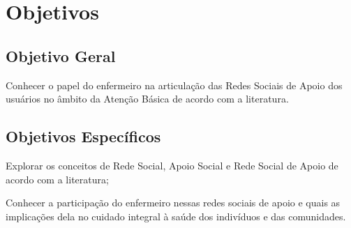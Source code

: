 \section{Objetivos}
\label{sec:objetivos}

\subsection{Objetivo Geral}
\label{sec:objetivo-geral}

Conhecer o papel do enfermeiro na articulação das Redes Sociais de Apoio dos usuários no âmbito da Atenção Básica de acordo com a literatura.

\subsection{Objetivos Específicos}
\label{sec:objetivos-especificos}

\begin{alineas}
	\item Explorar os conceitos de Rede Social, Apoio Social e Rede Social de Apoio de acordo com a literatura;
	\item Conhecer a participação do enfermeiro nessas redes sociais de apoio e quais as implicações dela no cuidado integral à saúde dos indivíduos e das comunidades.
\end{alineas}